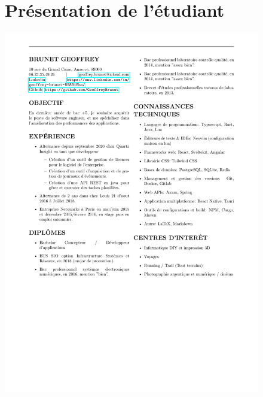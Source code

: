 \documentclass[a4paper, 11pt]{report}
\begin{document}
\begin{figure}
  \section{Présentation de l'étudiant}
  \includegraphics[scale=0.8, trim=2cm 0 0 0, clip]{CV-Geoffrey-Brunet.pdf}%
\end{figure}
\end{document}
